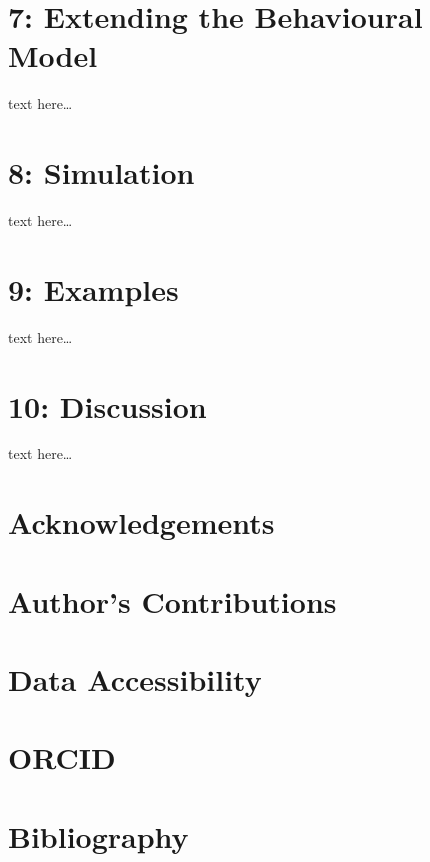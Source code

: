 \documentclass[
  11pt]{article}
\begin{document}
\hypertarget{extending-the-behavioural-model}{%
\section{7: Extending the Behavioural
Model}\label{extending-the-behavioural-model}}

text here\ldots{} \FloatBarrier

\hypertarget{simulation}{%
\section{8: Simulation}\label{simulation}}

text here\ldots{} \FloatBarrier

\hypertarget{examples}{%
\section{9: Examples}\label{examples}}

text here\ldots{} \FloatBarrier

\hypertarget{discussion}{%
\section{10: Discussion}\label{discussion}}

text here\ldots{}

\hypertarget{acknowledgements}{%
\section{Acknowledgements}\label{acknowledgements}}

\hypertarget{authors-contributions}{%
\section{Author's Contributions}\label{authors-contributions}}

\hypertarget{data-accessibility}{%
\section{Data Accessibility}\label{data-accessibility}}

\hypertarget{orcid}{%
\section{ORCID}\label{orcid}}

\hypertarget{bibliography}{%
\section{Bibliography}\label{bibliography}}
\end{document}
